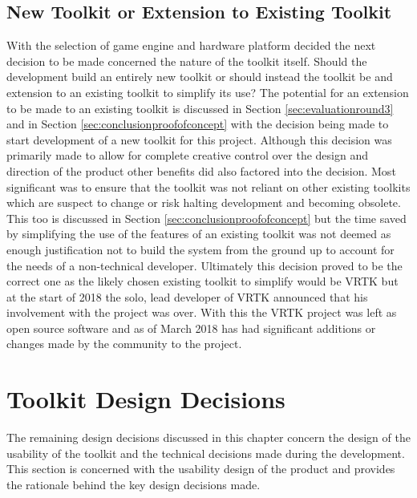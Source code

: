 \documentclass{l4proj}
\begin{document}
\subsection{New Toolkit or Extension to Existing Toolkit}
\label{sec:decisionnewtoolkit}
With the selection of game engine and hardware platform decided the next decision to be made concerned the nature of the toolkit itself. Should the development build an entirely new toolkit or should instead the toolkit be and extension to an existing toolkit to simplify its use? The potential for an extension to be made to an existing toolkit is discussed in Section \ref{sec:evaluationround3} and in Section \ref{sec:conclusionproofofconcept} with the decision being made to start development of a new toolkit for this project. Although this decision was primarily made to allow for complete creative control over the design and direction of the product other benefits did also factored into the decision. Most significant was to ensure that the toolkit was not reliant on other existing toolkits which are suspect to change or risk halting development and becoming obsolete. This too is discussed in Section \ref{sec:conclusionproofofconcept} but the time saved by simplifying the use of the features of an existing toolkit was not deemed as enough justification not to build the system from the ground up to account for the needs of a non-technical developer. Ultimately this decision proved to be the correct one as the likely chosen existing toolkit to simplify would be VRTK but at the start of 2018 the solo, lead developer of VRTK announced that his involvement with the project was over. With this the VRTK project was left as open source software and as of March 2018 has had significant additions or changes made by the community to the project. 

\section{Toolkit Design Decisions}
\label{sec:decisiontoolkitdecisions}
The remaining design decisions discussed in this chapter concern the design of the usability of the toolkit and the technical decisions made during the development. This section is concerned with the usability design of the product and provides the rationale behind the key design decisions made.
\end{document}
